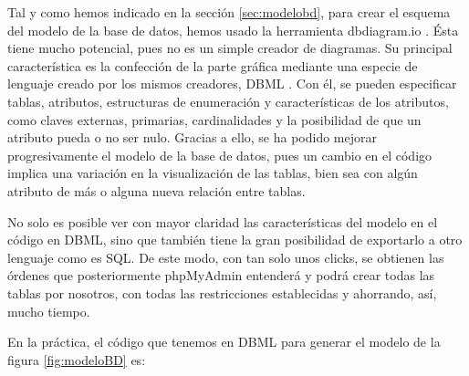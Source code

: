 Tal y como hemos indicado en la sección \ref{sec:modelobd}, para crear el esquema del modelo de la base de datos, hemos usado la herramienta dbdiagram.io \cite{dbdiagram}. Ésta tiene mucho potencial, pues no es un simple creador de diagramas. Su principal característica es la confección de la parte gráfica mediante una especie de lenguaje creado por los mismos creadores, DBML \cite{dbml}. Con él, se pueden especificar tablas, atributos, estructuras de enumeración y características de los atributos, como claves externas, primarias, cardinalidades y la posibilidad de que un atributo pueda o no ser nulo. Gracias a ello, se ha podido mejorar progresivamente el modelo de la base de datos, pues un cambio en el código implica una variación en la visualización de las tablas, bien sea con algún atributo de más o alguna nueva relación entre tablas.

No solo es posible ver con mayor claridad las características del modelo en el código en DBML, sino que también tiene la gran posibilidad de exportarlo a otro lenguaje como es SQL. De este modo, con tan solo unos clicks, se obtienen las órdenes que posteriormente phpMyAdmin entenderá y podrá crear todas las tablas por nosotros, con todas las restricciones establecidas y ahorrando, así, mucho tiempo.

En la práctica, el código que tenemos en DBML para generar el modelo de la figura \ref{fig:modeloBD} es:

